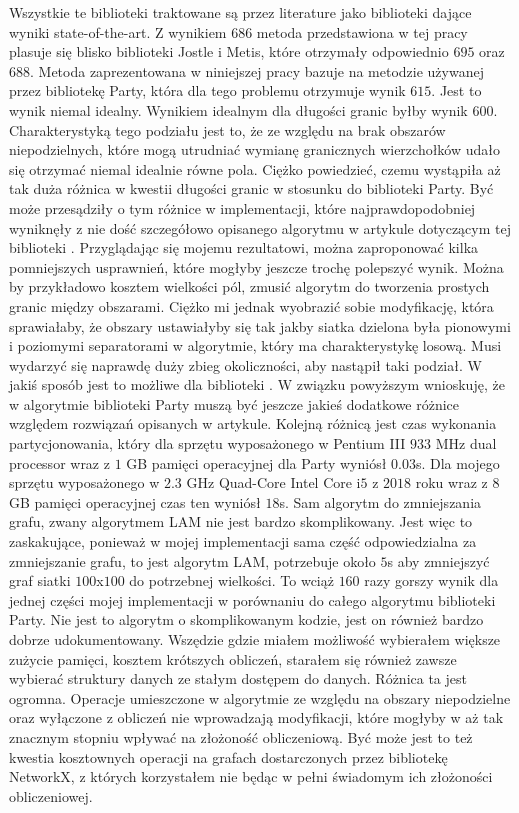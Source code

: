 Wszystkie te biblioteki traktowane są przez literature jako biblioteki dające wyniki state-of-the-art.
Z wynikiem $686$ metoda przedstawiona w tej pracy plasuje się blisko biblioteki Jostle i Metis,
które otrzymały odpowiednio $695$ oraz $688$.
Metoda zaprezentowana w niniejszej pracy bazuje na metodzie używanej przez bibliotekę Party, która dla tego problemu
otrzymuje wynik $615$.
Jest to wynik niemal idealny.
Wynikiem idealnym dla długości granic byłby wynik $600$.
Charakterystyką tego podziału jest to, że ze względu na brak obszarów niepodzielnych, które mogą utrudniać
wymianę granicznych wierzchołków udało się otrzymać niemal idealnie równe pola.
Ciężko powiedzieć, czemu wystąpiła aż tak duża różnica w kwestii długości granic w stosunku do biblioteki Party.
Być może przesądziły o tym różnice w implementacji, które najprawdopodobniej wyniknęły z nie dość szczegółowo opisanego algorytmu
w artykule dotyczącym tej biblioteki \cite{1364754}.
Przyglądając się mojemu rezultatowi, można zaproponować kilka pomniejszych usprawnień, które mogłyby jeszcze trochę polepszyć wynik.
Można by przykładowo kosztem wielkości pól, zmusić algorytm do tworzenia prostych granic między obszarami.
Ciężko mi jednak wyobrazić sobie modyfikację, która sprawiałaby, że obszary ustawiałyby się tak jakby siatka dzielona
była pionowymi i poziomymi separatorami w algorytmie, który ma charakterystykę losową.
Musi wydarzyć się naprawdę duży zbieg okoliczności, aby nastąpił taki podział.
W jakiś sposób jest to możliwe dla biblioteki \cite{1364754}.
W związku powyższym wnioskuję, że w algorytmie biblioteki Party \cite{1364754} muszą być jeszcze jakieś dodatkowe
różnice względem rozwiązań opisanych w artykule.
Kolejną różnicą jest czas wykonania partycjonowania, który dla sprzętu wyposażonego w Pentium III $933$ MHz dual processor
wraz z $1$ GB pamięci operacyjnej dla Party wyniósł $0.03$s.
Dla mojego sprzętu wyposażonego w $2.3$ GHz Quad-Core Intel Core i$5$ z $2018$ roku wraz z $8$ GB pamięci operacyjnej
czas ten wyniósł $18$s.
Sam algorytm do zmniejszania grafu, zwany algorytmem LAM nie jest bardzo skomplikowany.
Jest więc to zaskakujące, ponieważ w mojej implementacji sama część odpowiedzialna za zmniejszanie grafu, to jest algorytm LAM,
potrzebuje około $5$s aby zmniejszyć graf siatki $100$x$100$ do potrzebnej wielkości.
To wciąż $160$ razy gorszy wynik dla jednej części mojej implementacji w porównaniu do całego algorytmu biblioteki
Party.
Nie jest to algorytm o skomplikowanym kodzie, jest on również bardzo dobrze udokumentowany.
Wszędzie gdzie miałem możliwość wybierałem większe zużycie pamięci, kosztem krótszych obliczeń, starałem się również
zawsze wybierać struktury danych ze stałym dostępem do danych.
Różnica ta jest ogromna.
Operacje umieszczone w algorytmie ze względu na obszary niepodzielne oraz wyłączone z obliczeń nie wprowadzają
modyfikacji, które mogłyby w aż tak znacznym stopniu wpływać na złożoność obliczeniową.
Być może jest to też kwestia kosztownych operacji na grafach dostarczonych przez bibliotekę NetworkX,
z których korzystałem nie będąc w pełni świadomym ich złożoności obliczeniowej.

